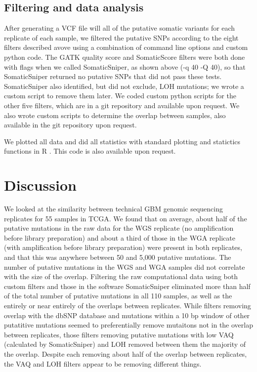 \documentclass[11pt]{article} %
\begin{document}
\subsection{Filtering and data analysis}

After generating a VCF file will all of the putative somatic variants for each replicate of each sample, we filtered the putative SNPs according to the eight filters described avove using a combination of command line options and custom python code. The GATK quality score and SomaticScore filters were both done with flags when we called SomaticSniper, as shown above (-q 40 -Q 40), so that SomaticSniper returned no putative SNPs that did not pass these tests. SomaticSniper also identified, but did not exclude, LOH mutations; we wrote a custom script to remove them later. We coded custom python scripts for the other five filters, which are in a git repository and available upon request. We also wrote custom scripts to determine the overlap between samples, also available in the git repository upon request.

We plotted all data and did all statistics with standard plotting and statictics functions in R \cite{Rsoftware}. This code is also available upon request.  

\section{Discussion}

We looked at the similarity between technical GBM genomic sequencing replicates for 55 samples in TCGA. We found that on average, about half of the putative mutations in the raw data for the WGS replicate (no amplification before library preparation) and about a third of those in the WGA replicate (with amplification before library preparation) were present in both replicates, and that this was anywhere between 50 and 5,000 putative mutations. The number of putative mutations in the WGS and WGA samples did not correlate with the size of the overlap. Filtering the raw computational data using both custom filters and those in the software SomaticSniper eliminated more than half of the total number of putative mutations in all 110 samples, as well as the entirely or near entirely of the overlaps between replicates. While filters removing overlap with the dbSNP database and mutations within a 10 bp window of other putatitive mutations seemed to preferentially remove mutaitons not in the overlap between replicates, those filters removing putative mutations with low VAQ (calculated by SomaticSniper) and LOH removed between them the majority of the overlap. Despite each removing about half of the overlap between replicates, the VAQ and LOH filters appear to be removing different things.
\end{document}
